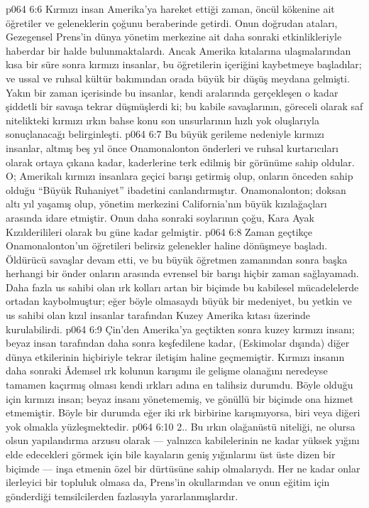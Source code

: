 \vs p064 6:6 Kırmızı insan Amerika’ya hareket ettiği zaman, öncül kökenine ait öğretiler ve geleneklerin çoğunu beraberinde getirdi. Onun doğrudan ataları, Gezegensel Prens’in dünya yönetim merkezine ait daha sonraki etkinlikleriyle haberdar bir halde bulunmaktalardı. Ancak Amerika kıtalarına ulaşmalarından kısa bir süre sonra kırmızı insanlar, bu öğretilerin içeriğini kaybetmeye başladılar; ve ussal ve ruhsal kültür bakımından orada büyük bir düşüş meydana gelmişti. Yakın bir zaman içerisinde bu insanlar, kendi aralarında gerçekleşen o kadar şiddetli bir savaşa tekrar düşmüşlerdi ki; bu kabile savaşlarının, göreceli olarak saf nitelikteki kırmızı ırkın bahse konu son unsurlarının hızlı yok oluşlarıyla sonuçlanacağı belirginleşti.
\vs p064 6:7 Bu büyük gerileme nedeniyle kırmızı insanlar, altmış beş yıl önce Onamonalonton önderleri ve ruhsal kurtarıcıları olarak ortaya çıkana kadar, kaderlerine terk edilmiş bir görünüme sahip oldular. O; Amerikalı kırmızı insanlara geçici barışı getirmiş olup, onların önceden sahip olduğu “Büyük Ruhaniyet” ibadetini canlandırmıştır. Onamonalonton; doksan altı yıl yaşamış olup, yönetim merkezini California’nın büyük kızılağaçları arasında idare etmiştir. Onun daha sonraki soylarının çoğu, Kara Ayak Kızılderilileri olarak bu güne kadar gelmiştir.
\vs p064 6:8 Zaman geçtikçe Onamonalonton’un öğretileri belirsiz gelenekler haline dönüşmeye başladı. Öldürücü savaşlar devam etti, ve bu büyük öğretmen zamanından sonra başka herhangi bir önder onların arasında evrensel bir barışı hiçbir zaman sağlayamadı. Daha fazla us sahibi olan ırk kolları artan bir biçimde bu kabilesel mücadelelerde ortadan kaybolmuştur; eğer böyle olmasaydı büyük bir medeniyet, bu yetkin ve us sahibi olan kızıl insanlar tarafından Kuzey Amerika kıtası üzerinde kurulabilirdi.
\vs p064 6:9 Çin’den Amerika’ya geçtikten sonra kuzey kırmızı insanı; beyaz insan tarafından daha sonra keşfedilene kadar, (Eskimolar dışında) diğer dünya etkilerinin hiçbiriyle tekrar iletişim haline geçmemiştir. Kırmızı insanın daha sonraki Âdemsel ırk kolunun karışımı ile gelişme olanağını neredeyse tamamen kaçırmış olması kendi ırkları adına en talihsiz durumdu. Böyle olduğu için kırmızı insan; beyaz insanı yönetememiş, ve gönüllü bir biçimde ona hizmet etmemiştir. Böyle bir durumda eğer iki ırk birbirine karışmıyorsa, biri veya diğeri yok olmakla yüzleşmektedir.
\vs p064 6:10 2.\bibnobreakspace {}. Bu ırkın olağanüstü niteliği, ne olursa olsun yapılandırma arzusu olarak --- yalnızca kabilelerinin ne kadar yüksek yığını elde edecekleri görmek için bile kayaların geniş yığınlarını üst üste dizen bir biçimde --- inşa etmenin özel bir dürtüsüne sahip olmalarıydı. Her ne kadar onlar ilerleyici bir topluluk olmasa da, Prens’in okullarından ve onun eğitim için gönderdiği temsilcilerden fazlasıyla yararlanmışlardır.
